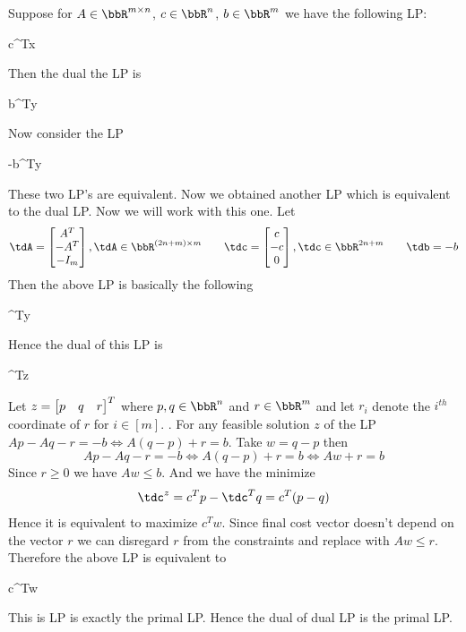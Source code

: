 \begin{proof-of-lemma}
	Suppose for $A\in\bbR^{m\times n}$, $c\in\bbR^n$, $b\in\bbR^m$ we have the following LP:\begin{maxi*}{}{c^Tx}{}{}
	\end{maxi*}
	Then the dual the LP is 		\begin{mini*}{}{b^Ty}{}{}
	\end{mini*}

	Now consider the LP

	\begin{maxi*}{}{-b^Ty}{}{}
	\end{maxi*}

	These two LP's are equivalent. Now we obtained another LP which is equivalent to the dual LP. Now we will work with this one. Let $$\tdA=\mat{A^T\\ -A^T\\ -I_m},\tdA\in\bbR^{(2n+m)\times m}\qquad \tdc=\mat{c\\ -c\\ 0},\tdc\in\bbR^{2n+m}\qquad \tdb=-b$$Then the above LP is basically the following 	\begin{maxi*}{}{\tdb^Ty}{}{}
	\end{maxi*}Hence the dual of this LP is 	\begin{mini*}{}{\tdc^Tz}{}{}
	\end{mini*}Let $z=\left[\begin{matrix} p & q & r\end{matrix}\right]^T$ where $p,q\in \bbR^n$ and $r\in\bbR^m$ and let $r_i$ denote the $i^{th}$ coordinate of $r$ for $i\in [m]$. . For any feasible solution $z$ of the LP $Ap-Aq-r=-b\iff A(q-p)+r=b$. Take $w=q-p$ then $$Ap-Aq-r=-b\iff A(q-p)+r=b\iff Aw+r=b$$Since $r\geq 0$ we have $Aw\leq b$. And we have the minimize $$\tdc^z=c^Tp-\tdc^Tq=c^T(p-q)$$Hence it is equivalent to maximize $c^Tw$. Since final cost vector doesn't depend on the vector $r$ we can disregard $r$ from the constraints and replace with $Aw\leq r$. Therefore the above LP is equivalent to  \begin{maxi*}{}{c^Tw}{}{}
	\end{maxi*}This is LP is exactly the primal LP. Hence the dual of dual LP is the primal LP.
\end{proof-of-lemma}

